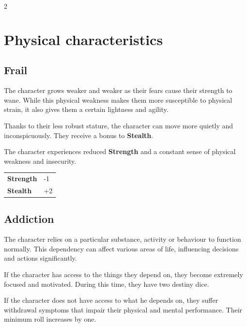 \begin{multicols}{2}
    \section{Physical characteristics}

    \subsection*{Frail}

    The character grows weaker and weaker as their fears cause their strength to wane. While this physical weakness makes them more susceptible to physical strain, it also gives them a certain lightness and agility.

    Thanks to their less robust stature, the character can move more quietly and inconspicuously. They receive a bonus to \textbf{Stealth}.

    The character experiences reduced \textbf{Strength} and a constant sense of physical weakness and insecurity.

    \begin{tabular}{@{}ll@{}}
        \textbf{Strength} & -1\\
        \textbf{Stealth} & +2\\
    \end{tabular}

    \subsection*{Addiction}

    The character relies on a particular substance, activity or behaviour to function normally. This dependency can affect various areas of life, influencing decisions and actions significantly.

    If the character has access to the things they depend on, they become extremely focused and motivated. During this time, they have two destiny dice.

    If the character does not have access to what he depends on, they suffer withdrawal symptoms that impair their physical and mental performance.  Their minimum roll increases by one.


\end{multicols}
